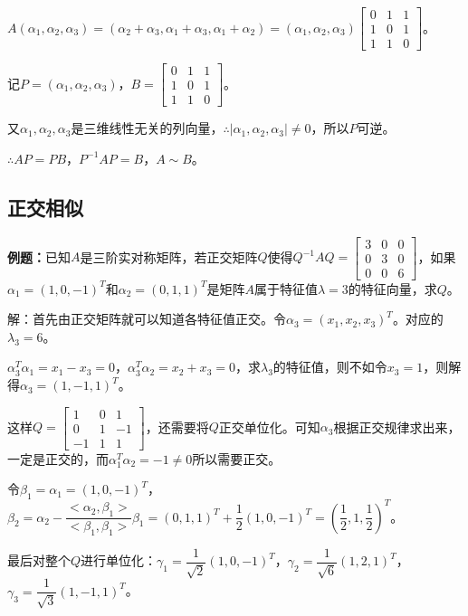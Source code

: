 \documentclass[UTF8, 12pt]{ctexart}
\begin{document}
$A(\alpha_1,\alpha_2,\alpha_3)=(\alpha_2+\alpha_3,\alpha_1+\alpha_3,\alpha_1+\alpha_2)=(\alpha_1,\alpha_2,\alpha_3)\left[\begin{array}{ccc}
    0 & 1 & 1 \\
    1 & 0 & 1 \\
    1 & 1 & 0
\end{array}\right]$。

记$P=(\alpha_1,\alpha_2,\alpha_3)$，$B=\left[\begin{array}{ccc}
    0 & 1 & 1 \\
    1 & 0 & 1 \\
    1 & 1 & 0
\end{array}\right]$。\medskip

又$\alpha_1,\alpha_2,\alpha_3$是三维线性无关的列向量，$\therefore\vert\alpha_1,\alpha_2,\alpha_3\vert\neq0$，所以$P$可逆。

$\therefore AP=PB$，$P^{-1}AP=B$，$A\sim B$。

\subsection{正交相似}

\textbf{例题：}已知$A$是三阶实对称矩阵，若正交矩阵$Q$使得$Q^{-1}AQ=\left[\begin{array}{ccc}
    3 & 0 & 0 \\
    0 & 3 & 0 \\
    0 & 0 & 6
\end{array}\right]$，如果$\alpha_1=(1,0,-1)^T$和$\alpha_2=(0,1,1)^T$是矩阵$A$属于特征值$\lambda=3$的特征向量，求$Q$。

解：首先由正交矩阵就可以知道各特征值正交。令$\alpha_3=(x_1,x_2,x_3)^T$。对应的$\lambda_3=6$。

$\alpha_3^T\alpha_1=x_1-x_3=0$，$\alpha_3^T\alpha_2=x_2+x_3=0$，求$\lambda_3$的特征值，则不如令$x_3=1$，则解得$\alpha_3=(1,-1,1)^T$。

这样$Q=\left[\begin{array}{ccc}
    1 & 0 & 1 \\
    0 & 1 & -1 \\
    -1 & 1 & 1
\end{array}\right]$，还需要将$Q$正交单位化。可知$\alpha_3$根据正交规律求出来，一定是正交的，而$\alpha_1^T\alpha_2=-1\neq0$所以需要正交。

令$\beta_1=\alpha_1=(1,0,-1)^T$，$\beta_2=\alpha_2-\dfrac{<\alpha_2,\beta_1>}{<\beta_1,\beta_1>}\beta_1=(0,1,1)^T+\dfrac{1}{2}(1,0,-1)^T=(\dfrac{1}{2},1,\dfrac{1}{2})^T$。

最后对整个$Q$进行单位化：$\gamma_1=\dfrac{1}{\sqrt{2}}(1,0,-1)^T$，$\gamma_2=\dfrac{1}{\sqrt{6}}(1,2,1)^T$，$\gamma_3=\dfrac{1}{\sqrt{3}}(1,-1,1)^T$。
\end{document}
